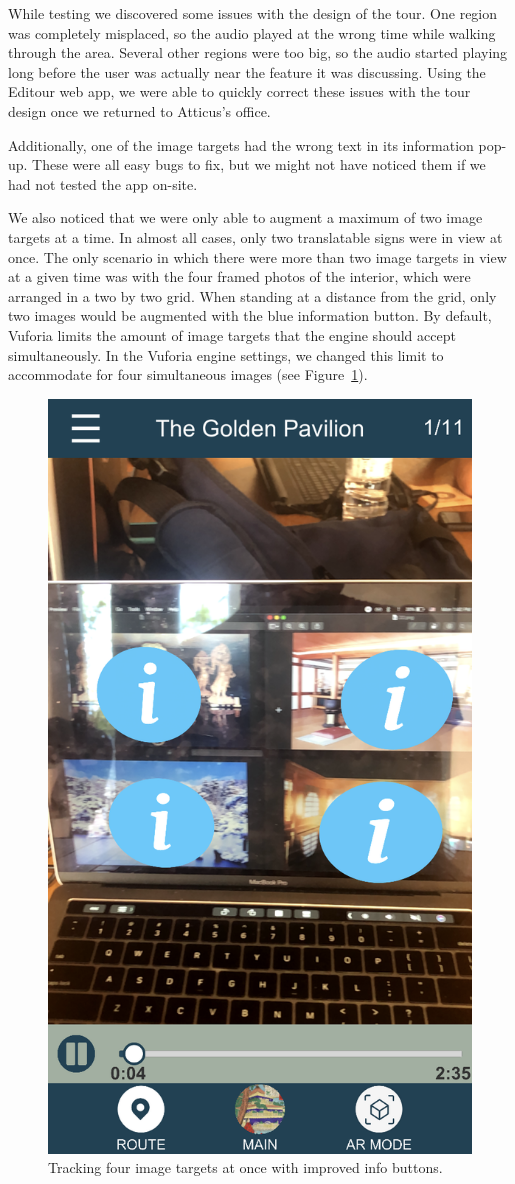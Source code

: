 \documentclass[a4paper, 10pt, american, titlepage]{article}
\begin{document}
While testing we discovered some issues with the design of the tour. One
region was completely misplaced, so the audio played at the wrong time while
walking through the area. Several other regions were too big, so the audio
started playing long before the user was actually near the feature it was
discussing. Using the Editour web app, we were able to quickly correct these
issues with the tour design once we returned to Atticus's office.

Additionally, one of the image targets had the wrong text in its information
pop-up. These were all easy bugs to fix, but we might not have noticed them if
we had not tested the app on-site.

We also noticed that we were only able to augment a maximum of two image targets
at a time. In almost all cases, only two translatable signs were in view at
once. The only scenario in which there were more than two image targets in view
at a given time was with the four framed photos of the interior, which were
arranged in a two by two grid. When standing at a distance from the grid, only
two images would be augmented with the blue information button. By default,
Vuforia limits the amount of image targets that the engine should accept
simultaneously. In the Vuforia engine settings, we changed this limit to
accommodate for four simultaneous images (see Figure~\ref{fig:fourIButtons}).

\begin{figure}[h]
	\centering
	\includegraphics[width=.5\textwidth]{four-i-buttons.png}
	\caption{Tracking four image targets at once with improved info buttons.}
	\label{fig:fourIButtons}
\end{figure}
\end{document}
